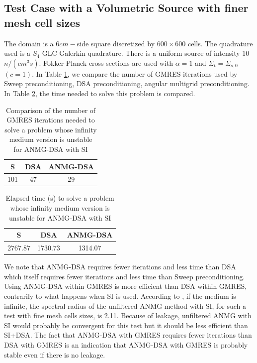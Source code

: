 \subsection{Test Case with a Volumetric Source with finer mesh cell sizes}
The domain is a 6$cm-$side square discretized by
  $600\times600$ cells. The quadrature used is a $S_4$ GLC Galerkin
  quadrature. There is a uniform source of intensity 10 $n/(cm^3s)$.
  Fokker-Planck cross sections are used with $\alpha=1$ and
  $\Sigma_t=\Sigma_{s,0}$ $(c=1)$. In Table
  \ref{new_gmres}, we compare the number of GMRES iterations used by Sweep
  preconditioning, DSA preconditioning, angular multigrid
  preconditioning. In Table \ref{new_time}, the time needed to solve 
  this problem is compared.
  \begin{table}[H]
    \begin{center}
      \caption{Comparison of the number of GMRES iterations needed to solve a
      problem whose infinity medium version is unstable for ANMG-DSA with SI}
      \begin{tabular}{|c|c|c|}
        \hline
         S & DSA & ANMG-DSA\\
        \hline
        101 & 47 & 29 \\
        \hline
      \end{tabular}
      \label{new_gmres}
    \end{center}
  \end{table}
  \begin{table}[H]
    \begin{center}
      \caption{Elapsed time (s) to solve a
      problem whose infinity medium version is unstable for ANMG-DSA with SI}
      \begin{tabular}{|c|c|c|}
        \hline
         S & DSA & ANMG-DSA\\
        \hline
        2767.87 & 1730.73 & 1314.07 \\
        \hline
      \end{tabular}
      \label{new_time}
    \end{center}
  \end{table}
  We note that ANMG-DSA requires fewer iterations and less time than DSA which 
  itself requires fewer iterations and less time than Sweep preconditioning.
  Using ANMG-DSA within GMRES is more efficient than DSA within GMRES,
  contrarily to what happens when SI is used. According to \cite{shawn_phd},
  if the medium is infinite, the spectral radius of the unfiltered ANMG method 
  with SI, for such a test with fine mesh cells sizes, is 2.11. Because of leakage, unfiltered ANMG with SI would probably 
  be convergent for this test but it should
  be less efficient than SI+DSA. The fact that ANMG-DSA with GMRES requires
  fewer iterations than DSA with GMRES is an indication that ANMG-DSA
with GMRES is probably stable even if there is no leakage.
